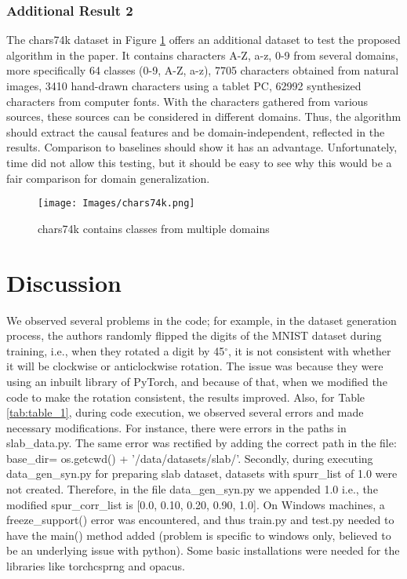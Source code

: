 \subsubsection{Additional Result 2}
The chars74k \cite{chars74k} dataset in Figure \ref{fig:chars74k} offers an additional dataset to test the proposed algorithm in the paper. It contains characters A-Z, a-z, 0-9 from several domains, more specifically 64 classes (0-9, A-Z, a-z), 7705 characters obtained from natural images, 3410 hand-drawn characters using a tablet PC, 62992 synthesized characters from computer fonts. With the characters gathered from various sources, these sources can be considered in different domains. Thus, the algorithm should extract the causal features and be domain-independent, reflected in the results. Comparison to baselines should show it has an advantage. Unfortunately, time did not allow this testing, but it should be easy to see why this would be a fair comparison for domain generalization.
 

\begin{center}
    \begin{figure}[h!]
    \begin{center}
      \texttt{[image: Images/chars74k.png]}
      \caption{chars74k contains classes from multiple domains \cite{chars74k}}
      \label{fig:chars74k}
      \end{center}
    \end{figure}
\end{center}

\section{Discussion}

We observed several problems in the code; for example, in the dataset generation process, the authors randomly flipped the digits of the MNIST dataset during training, i.e., when they rotated a digit by 45$^{\circ}$, it is not consistent with whether it will be clockwise or anticlockwise rotation. The issue was because they were using an inbuilt library of PyTorch, and because of that, when we modified the code to make the rotation consistent, the results improved. Also, for Table \ref{tab:table_1}, during code execution, we observed several errors and made necessary modifications. For instance, there were errors in the paths in slab\_data.py. The same error was rectified by adding the correct path in the file: base\_dir= os.getcwd() + '/data/datasets/slab/'. Secondly, during executing data\_gen\_syn.py for preparing slab dataset, datasets with spurr\_list of 1.0 were not created. Therefore, in the file data\_gen\_syn.py we appended 1.0 i.e., the modified spur\_corr\_list is [0.0, 0.10, 0.20, 0.90, 1.0]. On Windows machines, a freeze\_support() error was encountered, and thus train.py and test.py needed to have the main() method added (problem is specific to windows only, believed to be an underlying issue with python). Some basic installations were needed for the libraries like torchcsprng and opacus.

